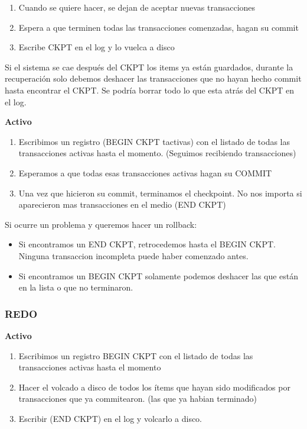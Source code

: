 \begin{enumerate}
\item Cuando se quiere hacer, se dejan de aceptar nuevas transacciones
\item Espera a que terminen todas las transacciones comenzadas, hagan su commit
\item Escribe CKPT en el log y lo vuelca a disco
\end{enumerate}

Si el sistema se cae después del CKPT los items ya están guardados, durante la recuperación solo debemos deshacer las transacciones que no hayan hecho commit hasta encontrar el CKPT. Se podría borrar todo lo que esta atrás del CKPT en el log.

\bigskip

\textbf{Activo}

\begin{enumerate}
\item Escribimos un registro (BEGIN CKPT tactivas) con el listado de todas las transacciones  activas hasta el momento. (Seguimos recibiendo transacciones)
\item Esperamos a que todas esas transacciones activas hagan su COMMIT
\item Una vez que hicieron su commit, terminamos el checkpoint. No nos importa si aparecieron mas transacciones en el medio (END CKPT)
\end{enumerate}

Si ocurre un problema y queremos hacer un rollback:
\begin{itemize}
\item Si encontramos un END CKPT, retrocedemos hasta el BEGIN CKPT. Ninguna transaccion incompleta puede haber comenzado antes.
\item Si encontramos un BEGIN CKPT solamente podemos deshacer las que están en la lista o que no terminaron. 
\end{itemize}


\subsubsection*{REDO}

\textbf{Activo}

\begin{enumerate}
\item Escribimos un registro BEGIN CKPT con el listado de todas las transacciones activas hasta el momento
\item Hacer el volcado a disco de todos los ítems que hayan sido modificados por transacciones que ya commitearon. (las que ya habian terminado)
\item Escribir (END CKPT) en el log y volcarlo a disco.
\end{enumerate}

